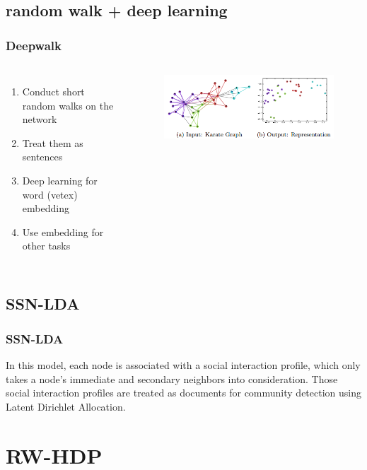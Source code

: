 \documentclass{beamer}
\begin{document}
\subsection{random walk + deep learning}
\begin{frame}
\frametitle{Deepwalk}
\begin{columns}[t] %
	
	\begin{enumerate}
		\item Conduct short random walks on the network
		\item Treat them as sentences
		\item Deep learning for word (vetex) embedding
		\item Use embedding for other tasks
	\end{enumerate}
	
	\begin{figure}
		\centering
		\includegraphics[scale=0.4]{deepwalk.png}
	\end{figure}
\end{columns}
\end{frame}

\subsection{SSN-LDA}
\begin{frame}
\frametitle{SSN-LDA}
In this model, each node is associated with a social interaction profile, which only takes a node's immediate and secondary neighbors into consideration. Those social interaction profiles are treated as documents for community detection using Latent Dirichlet Allocation.	
\end{frame}


\section{RW-HDP}
\end{document}
